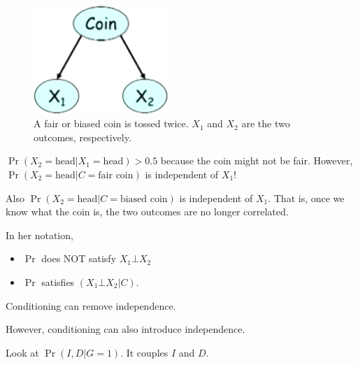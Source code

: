\documentclass[12pt]{article}
\begin{document}
\begin{figure}[H]
\centering
\includegraphics[width=2in]{graphics/example_coin.png}
\caption{A fair or biased coin is tossed twice. $X_1$ and $X_2$ are the two outcomes, respectively.}
\label{fig:example_coin}
\end{figure}


$\Pr(X_2 = \text{head} | X_1 = \text{head}) > 0.5$ because the coin might not be fair.
However, $\Pr(X_2 = \text{head}| C = \text{fair coin})$ is independent of $X_1$!

Also $\Pr(X_2 = \text{head}| C = \text{biased coin})$ is independent of $X_1$. That is, once we know what the coin is, the two outcomes are no longer correlated.

In her notation,
\begin{itemize}
  \item $\Pr$ does NOT satisfy $X_1 \bot X_2$
  \item $\Pr$ satisfies $(X_1 \bot X_2 | C)$.
\end{itemize}
Conditioning can remove independence.


However, conditioning can also introduce independence.

Look at $\Pr(I, D| G = 1)$.  It couples $I$ and $D$.









\end{document}
